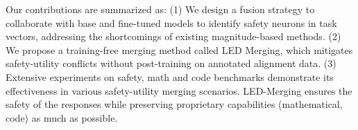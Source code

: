 Our contributions are summarized as: (1) We design a fusion strategy to collaborate with base and fine-tuned models to identify safety neurons in task vectors, addressing the shortcomings of existing magnitude-based methods. (2) We propose a training-free merging method called LED Merging, which mitigates safety-utility conflicts without post-training on annotated alignment data.  (3) Extensive experiments on safety, math and code benchmarks demonstrate its effectiveness in various safety-utility merging scenarios. LED-Merging ensures the safety of the responses while preserving proprietary capabilities (mathematical, code) as much as possible. 

